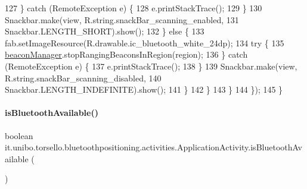 \begin{DoxyCode}
127                         \} \textcolor{keywordflow}{catch} (RemoteException e) \{
128                             e.printStackTrace();
129                         \}
130                         Snackbar.make(view, R.string.snackBar\_scanning\_enabled,
131                                 Snackbar.LENGTH\_SHORT).show();
132                     \} \textcolor{keywordflow}{else} \{
133                         fab.setImageResource(R.drawable.ic\_bluetooth\_white\_24dp);
134                         \textcolor{keywordflow}{try} \{
135                             \hyperlink{classit_1_1unibo_1_1torsello_1_1bluetoothpositioning_1_1activities_1_1ApplicationActivity_a973c37226a3dbba6016966c3555aff65_a973c37226a3dbba6016966c3555aff65}{beaconManager}.stopRangingBeaconsInRegion(region);
136                         \} \textcolor{keywordflow}{catch} (RemoteException e) \{
137                             e.printStackTrace();
138                         \}
139                         Snackbar.make(view, R.string.snackBar\_scanning\_disabled,
140                                 Snackbar.LENGTH\_INDEFINITE).show();
141                     \}
142                 \}
143             \}
144         \});
145     \}
\end{DoxyCode}
\hypertarget{classit_1_1unibo_1_1torsello_1_1bluetoothpositioning_1_1activities_1_1ApplicationActivity_abffd55741be864ad5b151c8f8c6d70ff_abffd55741be864ad5b151c8f8c6d70ff}{}\label{classit_1_1unibo_1_1torsello_1_1bluetoothpositioning_1_1activities_1_1ApplicationActivity_abffd55741be864ad5b151c8f8c6d70ff_abffd55741be864ad5b151c8f8c6d70ff} 
\paragraph{\texorpdfstring{is\+Bluetooth\+Available()}{isBluetoothAvailable()}}
{\footnotesize\ttfamily boolean it.\+unibo.\+torsello.\+bluetoothpositioning.\+activities.\+Application\+Activity.\+is\+Bluetooth\+Available (\begin{DoxyParamCaption}{ }\end{DoxyParamCaption})\hspace{0.3cm}{\ttfamily [private]}}


